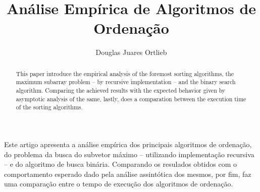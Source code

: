 \documentclass[12pt]{article}
\title{Análise Empírica de Algoritmos de Ordenação}
\author{Douglas Juares Ortlieb\inst{1} \inst{2}}
\begin{document}
 

\maketitle

\begin{abstract}
  This paper introduce the empirical analysis of the foremost sorting algorithms, the maximum subarray problem -- by recursive implementation -- and the binary search algorithm. Comparing the achieved results with the expected behavior given by asymptotic analysis of the same, lastly, does a comparation between the execution time of the sorting algorithms.
\end{abstract}
     
\begin{resumo}
  Este artigo apresenta a análise empírica dos principais algoritmos de ordenação, do problema da busca do subvetor máximo -- utilizando implementação recursiva -- e do algoritmo de busca binária. Comparando os resulados obtidos com o comportamento esperado dado pela análise assintótica dos mesmos, por fim, faz uma comparação entre o tempo de execução dos algoritmos de ordenação.
\end{resumo}








\end{document}
